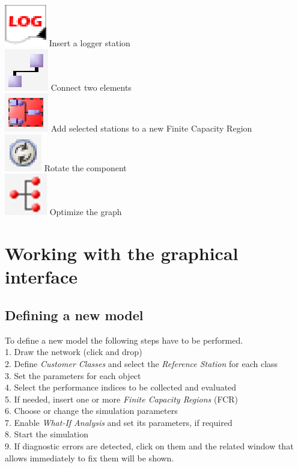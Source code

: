 \includegraphics[scale=.5]{img/jsimg/logger}  Insert a logger station\\
\includegraphics[scale=.5]{img/jsimg/connect}  Connect two elements\\
\includegraphics[scale=.5]{img/jsimg/addStationToNFCR}  Add selected
stations to a new Finite Capacity
Region\\
\includegraphics[scale=.5]{img/jsimg/rotate}  Rotate the component\\
\includegraphics[scale=.5]{img/jsimg/optimizeGraph}  Optimize the graph\\

\section{Working with the graphical interface}
\subsection{Defining a new model} \label{sec:DefiningANewModel}
To define a new model the following steps have to be performed.\\
1. Draw the network (click and drop) \\
2. Define \emph{Customer Classes} and select the \emph{Reference Station} for each
class\\
3. Set the parameters for each object\\
4. Select the performance indices to be collected and evaluated\\
5. If needed, insert one or more \emph{Finite Capacity Regions} (FCR)\\
6. Choose or change the simulation parameters\\
7. Enable \emph{What-If Analysis} and set its parameters, if required\\
8. Start the simulation\\
9. If diagnostic errors are detected, click on them and the
related window that allows immediately to fix them will be
shown.\\

